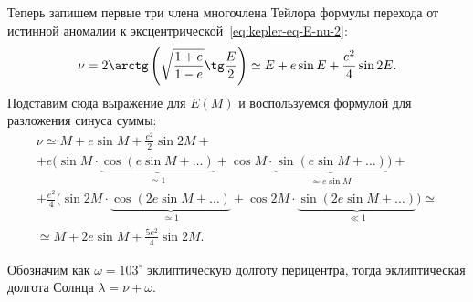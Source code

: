 Теперь запишем первые три члена многочлена Тейлора формулы перехода от истинной аномалии к эксцентрической~\eqref{eq:kepler-eq-E-nu-2}:
\begin{equation*}
    \nu
        = 2 \arctg \left(\sqrt{\frac{1+e}{1-e}} \tg \frac{E}{2} \right)
        \simeq E + e \sin E + \frac{e^2}{4} \sin 2E.
\end{equation*}
Подставим сюда выражение для $E(M)$ и воспользуемся формулой для разложения синуса суммы:
\begin{multline*}
    \nu
        \simeq M + e \sin M + \frac{e^2}{2} \sin 2M + \\
        + e \bigg( \sin M \cdot \underbrace{\cos (e \sin M + \ldots)}_{\simeq 1} + \cos M \cdot \underbrace{\sin ( e \sin M  + \ldots )}_{\simeq e \sin M} \bigg) + \\
        + \frac{e^2}{4} \bigg( \sin 2M \cdot \underbrace{\cos (2e \sin M + \ldots)}_{\simeq 1} + \cos 2M \cdot \underbrace{\sin (2e \sin M + \ldots)}_{\ll 1}\bigg)  \simeq \\
        \simeq M + 2e \sin M + \frac{5e^2}{4} \sin 2M.
\end{multline*}

Обозначим как $\omega = 103^\circ$ эклиптическую долготу перицентра, тогда эклиптическая долгота Солнца $\lambda = \nu + \omega$.

